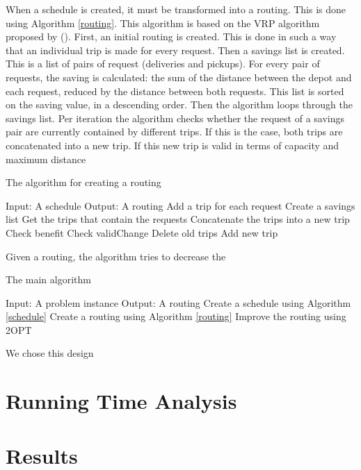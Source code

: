 \documentclass[a4paper]{article}
\begin{document}
When a schedule is created, it must be transformed into a routing. This is done using Algorithm \ref{routing}. This algorithm is based on the VRP algorithm proposed by \citeauthor{cw64} (\citeyear{cw64}). First, an initial routing is created. This is done in such a way that an individual trip is made for every request. Then a savings list is created. This is a list of pairs of request (deliveries and pickups). For every pair of requests, the saving is calculated: the sum of the distance between the depot and each request, reduced by the distance between both requests. This list is sorted on the saving value, in a descending order. Then the algorithm loops through the savings list. Per iteration the algorithm checks whether the request of a savings pair are currently contained by different trips. If this is the case, both trips are concatenated into a new trip. If this new trip is valid in terms of capacity and maximum distance

\begin{algorithm}[H]
	\caption{The algorithm for creating a routing}
	\label{routing}
	\begin{algorithmic}
		\State Input: A schedule
		\State Output: A routing
			\State Add a trip for each request
			\State Create a savings list
				\State Get the trips that contain the requests
					\State Concatenate the trips into a new trip
						\State Check benefit
						\State Check validChange
							\State Delete old trips
							\State Add new trip
						\EndIf
					\EndIf
				\EndIf
			\EndFor
		\EndFor
	\end{algorithmic}
\end{algorithm}

Given a routing, the algorithm tries to decrease the 	

\begin{algorithm}[H]
	\caption{The main algorithm}
	\label{main}
	\begin{algorithmic}
		\State Input: A problem instance
		\State Output: A routing
		\While{The routing is not valid}
			\State Create a schedule using Algorithm \ref{schedule}
			\State Create a routing using Algorithm \ref{routing}
		\EndWhile
		\State Improve the routing using 2OPT
	\end{algorithmic}
\end{algorithm}

We chose this design

\section{Running Time Analysis}

\section{Results}



\end{document}
